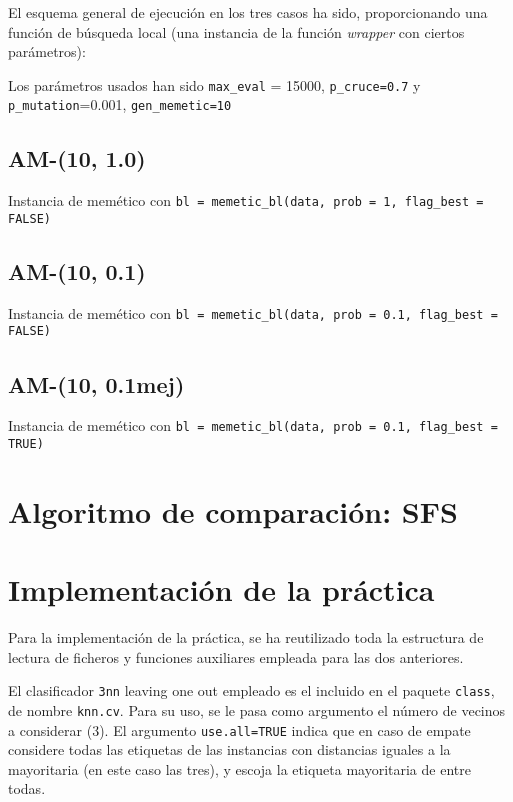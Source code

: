 \documentclass[a4paper,11pt]{article}
\begin{document}
\small{\texttt{}}
\normalsize


El esquema general de ejecución en los tres casos ha sido, proporcionando una función de búsqueda local (una instancia de la
función \textit{wrapper} con ciertos parámetros):

\small{\texttt{}}
\normalsize

Los parámetros usados han sido \texttt{max\_eval} = 15000, \texttt{p\_cruce=0.7} y \texttt{p\_mutation}=0.001, \texttt{gen\_memetic=10}

\subsection{AM-(10, 1.0)}

Instancia de memético con \texttt{bl = memetic\_bl(data, prob = 1, flag\_best = FALSE)}

\subsection{AM-(10, 0.1)}

Instancia de memético con \texttt{bl = memetic\_bl(data, prob = 0.1, flag\_best = FALSE)}

\subsection{AM-(10, 0.1mej)}

Instancia de memético con \texttt{bl = memetic\_bl(data, prob = 0.1, flag\_best = TRUE)}


\section{Algoritmo de comparación: SFS}

\small{\texttt{}}
\normalsize


\section{Implementación de la práctica}
Para la implementación de la práctica, se ha reutilizado toda la estructura de lectura de ficheros y funciones auxiliares
empleada para las dos anteriores.

El clasificador \texttt{3nn} leaving one out empleado es el incluido en el paquete \texttt{class}, de nombre
\texttt{knn.cv}. Para su uso, se le pasa como argumento el número de vecinos a considerar (3). El argumento 
\texttt{use.all=TRUE} indica que en caso de empate considere todas las etiquetas de las instancias con distancias 
iguales a la mayoritaria (en este caso las tres), y escoja la etiqueta mayoritaria de entre todas. 
\end{document}
